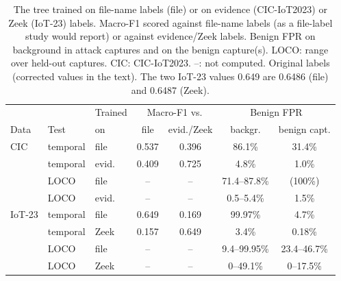 \begin{table}[t]
\centering
\caption{The tree trained on file-name labels (file) or on evidence (CIC-IoT2023) or Zeek (IoT-23) labels. Macro-F1 scored against file-name labels (as a file-label study would report) or against evidence/Zeek labels. Benign FPR on background in attack captures and on the benign capture(s). LOCO: range over held-out captures. CIC: CIC-IoT2023. --: not computed. Original labels (corrected values in the text). The two IoT-23 values 0.649 are 0.6486 (file) and 0.6487 (Zeek).}
\label{tab:filelabel}
\footnotesize
\setlength{\tabcolsep}{2.6pt}
\begin{tabular}{lllcccc}
\hline
 & & Trained & \multicolumn{2}{c}{Macro-F1 vs.} & \multicolumn{2}{c}{Benign FPR} \\
Data & Test & on & file & evid./Zeek & backgr. & benign capt. \\
\hline
CIC & temporal & file  & 0.537 & 0.396 & 86.1\% & 31.4\% \\
            & temporal & evid. & 0.409 & 0.725 & 4.8\% & 1.0\% \\
            & LOCO     & file  & --    & --    & 71.4--87.8\% & (100\%) \\
            & LOCO     & evid. & --    & --    & 0.5--5.4\% & 1.5\% \\
\hline
IoT-23      & temporal & file  & 0.649 & 0.169 & 99.97\% & 4.7\% \\
            & temporal & Zeek  & 0.157 & 0.649 & 3.4\% & 0.18\% \\
            & LOCO     & file  & --    & --    & 9.4--99.95\% & 23.4--46.7\% \\
            & LOCO     & Zeek  & --    & --    & 0--49.1\% & 0--17.5\% \\
\hline
\end{tabular}
\end{table}


